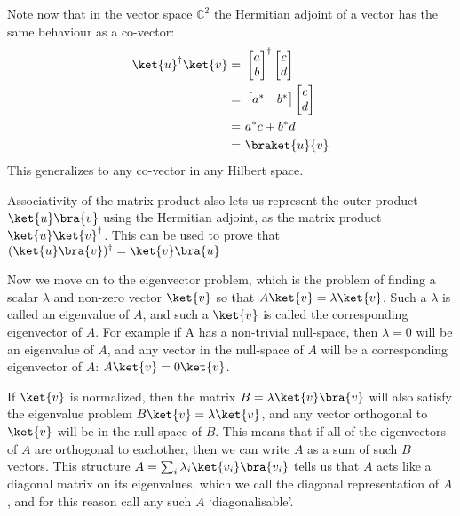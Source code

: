 Note now that in the vector space $\mathbb{C}^2$ the Hermitian adjoint of a vector has the same behaviour as a co-vector:
\begin{align*}
	\ket{u}^\dagger\ket{v}
	=&\ 
	\left[\begin{matrix}
		a\\
		b
	\end{matrix}\right]^\dagger
	\left[\begin{matrix}
		c\\
		d
	\end{matrix}\right]
	\\=&\ 
	\left[\begin{matrix}
		a^*&b^*
	\end{matrix}\right]
	\left[\begin{matrix}
		c\\
		d
	\end{matrix}\right]
	\\=&\ a^*c+b^*d
	\\=&\ \braket{u}{v}
\end{align*}
This generalizes to any co-vector in any Hilbert space.

Associativity of the matrix product also lets us represent the outer product $\ket{u}\bra{v}$ using the Hermitian adjoint, as the matrix product $\ket{u}\ket{v}^\dagger$. This can be used to prove that
$(\ket{u}\bra{v})^\dagger = \ket{v}\bra{u}$

Now we move on to the eigenvector problem, which is the problem of finding a scalar $\lambda$ and non-zero vector $\ket{v}$ so that $A\ket{v}=\lambda\ket{v}$. Such a $\lambda$ is called an eigenvalue of $A$, and such a $\ket{v}$ is called the corresponding eigenvector of $A$. For example if A has a non-trivial null-space, then $\lambda=0$ will be an eigenvalue of $A$, and any vector in the null-space of $A$ will be a corresponding eigenvector of $A$: $A\ket{v} = 0\ket{v}$.

If $\ket{v}$ is normalized, then the matrix $B=\lambda\ket{v}\bra{v}$ will also satisfy the eigenvalue problem $B\ket{v}=\lambda\ket{v}$, and any vector orthogonal to $\ket{v}$ will be in the null-space of $B$. This means that if all of the eigenvectors of $A$ are orthogonal to eachother, then we can write $A$ as a sum of such $B$ vectors. This structure $A = \sum_i \lambda_i \ket{v_i}\bra{v_i}$ tells us that $A$ acts like a diagonal matrix on its eigenvalues, which we call the diagonal representation of $A$, and for this reason call any such $A$ `diagonalisable'.

